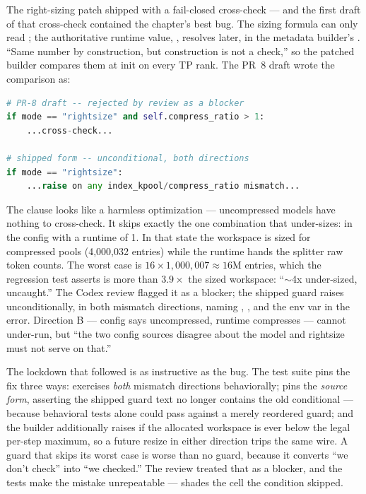 \begin{hbwarstory}
The right-sizing patch shipped with a fail-closed cross-check --- and the first
draft of that cross-check contained the chapter's best bug. The sizing formula
can only read ; the authoritative runtime
value, , resolves later, in the metadata
builder's . ``Same number by construction, but construction is
not a check,'' so the patched builder compares them at init on every TP rank.
The PR~8 draft wrote the comparison as:

\begin{lstlisting}[language=Python]
# PR-8 draft -- rejected by review as a blocker
if mode == "rightsize" and self.compress_ratio > 1:
    ...cross-check...

# shipped form -- unconditional, both directions
if mode == "rightsize":
    ...raise on any index_kpool/compress_ratio mismatch...
\end{lstlisting}

The  clause looks like a harmless optimization ---
uncompressed models have nothing to cross-check. It skips exactly the one
combination that under-sizes:  in the config with a
runtime  of 1. In that state the workspace is sized for
compressed pools (4{,}000{,}032 entries) while the runtime hands the splitter
raw token counts. The worst case is $16 \times 1{,}000{,}007 \approx 16$M
entries, which the regression test asserts is more than $3.9\times$ the sized
workspace: ``$\sim$4x under-sized, uncaught.'' The Codex review flagged it as
a blocker; the shipped guard raises unconditionally, in both mismatch
directions, naming , , and the env var
in the error. Direction B --- config says uncompressed, runtime compresses ---
cannot under-run, but ``the two config sources disagree about the model and
rightsize must not serve on that.''
\end{hbwarstory}

The lockdown that followed is as instructive as the bug. The test suite pins
the fix three ways: 
exercises \emph{both} mismatch directions behaviorally;
 pins the \emph{source form},
asserting the shipped guard text no longer contains the old
conditional --- because behavioral tests alone could pass against a merely
reordered guard; and the builder additionally raises if the allocated
workspace is ever below the legal per-step maximum, so a future resize in
either direction trips the same wire. A guard that skips its worst case is
worse than no guard, because it converts ``we don't check'' into ``we
checked.'' The review treated that as a blocker, and the tests make the
mistake unrepeatable ---  shades the cell the
condition skipped.

